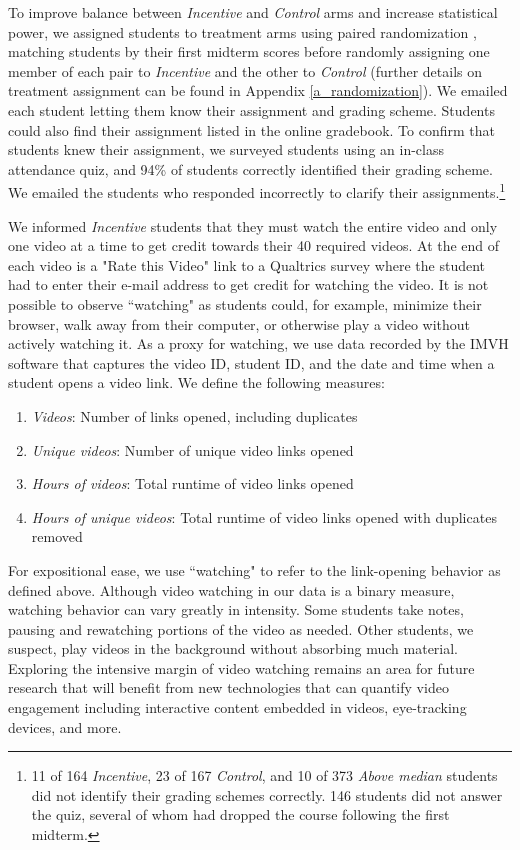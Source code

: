 \documentclass[12pt]{article}
\begin{document}
To improve balance between \textit{Incentive} and \textit{Control} arms and increase statistical power, we assigned students to treatment arms using paired randomization \parencite{ai2017}, matching students by their first midterm scores before randomly assigning one member of each pair to \textit{Incentive} and the other to \textit{Control} (further details on treatment assignment can be found in Appendix \ref{a_randomization}). We emailed each student letting them know their assignment and grading scheme. Students could also find their assignment listed in the online gradebook. To confirm that students knew their assignment, we surveyed students using an in-class attendance quiz, and 94\% of students correctly identified their grading scheme. We emailed the students who responded incorrectly to clarify their assignments.\footnote{11 of 164 \textit{Incentive}, 23 of 167 \textit{Control}, and 10 of 373 \textit{Above median} students did not identify their grading schemes correctly. 146 students did not answer the quiz, several of whom had dropped the course following the first midterm.}

We informed \textit{Incentive} students that they must watch the entire video and only one video at a time to get credit towards their 40 required videos. At the end of each video is a "Rate this Video" link  to a Qualtrics survey where the student had to enter their e-mail address to get credit for watching the video.  It is not possible to observe ``watching" as students could, for example, minimize their browser, walk away from their computer, or otherwise play a video without actively watching it. As a proxy for watching, we use data recorded by the IMVH software that captures the video ID, student ID, and the date and time when a student opens a video link. We define the following measures:
\begin{enumerate}
	\item \textit{Videos}: Number of links opened, including duplicates
	\item \textit{Unique videos}: Number of unique video links opened
	\item \textit{Hours of videos}: Total runtime of video links opened
	\item \textit{Hours of unique videos}: Total runtime of video links opened with duplicates removed
\end{enumerate}

For expositional ease, we use ``watching" to refer to the link-opening behavior as defined above. Although video watching in our data is a binary measure, watching behavior can vary greatly in intensity. Some students take notes, pausing and rewatching portions of the video as needed. Other students, we suspect, play videos in the background without absorbing much material. Exploring the intensive margin of video watching remains an area for future research that will benefit from new technologies that can quantify video engagement including interactive content embedded in videos, eye-tracking devices, and more.
\end{document}
